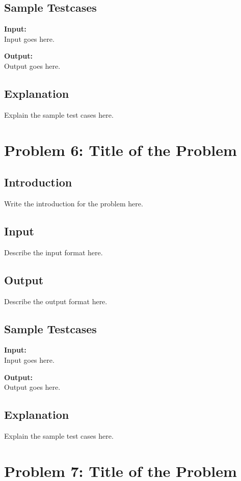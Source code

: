 \documentclass[12pt]{article}
\begin{document}
\subsection*{Sample Testcases}
\textbf{Input:} \\
Input goes here.

\textbf{Output:} \\
Output goes here.

\subsection*{Explanation}
Explain the sample test cases here.

\newpage

\section*{Problem 6: Title of the Problem}

\subsection*{Introduction}
Write the introduction for the problem here.

\subsection*{Input}
Describe the input format here.

\subsection*{Output}
Describe the output format here.

\subsection*{Sample Testcases}
\textbf{Input:} \\
Input goes here.

\textbf{Output:} \\
Output goes here.

\subsection*{Explanation}
Explain the sample test cases here.

\newpage

\section*{Problem 7: Title of the Problem}
\end{document}
